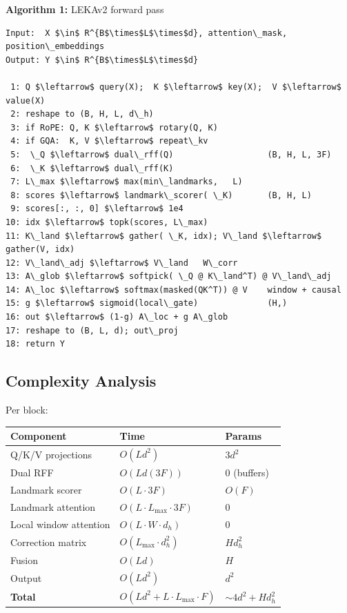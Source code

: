 \textbf{Algorithm 1:} LEKAv2 forward pass
\begin{lstlisting}
Input:  X $\in$ R^{B$\times$L$\times$d}, attention\_mask, position\_embeddings
Output: Y $\in$ R^{B$\times$L$\times$d}

 1: Q $\leftarrow$ query(X);  K $\leftarrow$ key(X);  V $\leftarrow$ value(X)
 2: reshape to (B, H, L, d\_h)
 3: if RoPE: Q, K $\leftarrow$ rotary(Q, K)
 4: if GQA:  K, V $\leftarrow$ repeat\_kv
 5:  \_Q $\leftarrow$ dual\_rff(Q)                   (B, H, L, 3F)
 6:  \_K $\leftarrow$ dual\_rff(K)
 7: L\_max $\leftarrow$ max(min\_landmarks,   L)
 8: scores $\leftarrow$ landmark\_scorer( \_K)       (B, H, L)
 9: scores[:, :, 0] $\leftarrow$ 1e4
10: idx $\leftarrow$ topk(scores, L\_max)
11: K\_land $\leftarrow$ gather( \_K, idx); V\_land $\leftarrow$ gather(V, idx)
12: V\_land\_adj $\leftarrow$ V\_land   W\_corr
13: A\_glob $\leftarrow$ softpick( \_Q @ K\_land^T) @ V\_land\_adj
14: A\_loc $\leftarrow$ softmax(masked(QK^T)) @ V    window + causal
15: g $\leftarrow$ sigmoid(local\_gate)              (H,)
16: out $\leftarrow$ (1-g) A\_loc + g A\_glob
17: reshape to (B, L, d); out\_proj
18: return Y
\end{lstlisting}

\subsection{Complexity Analysis}

Per block:

\begin{table}[H]
\centering
\small
\begin{tabular}{lll}
\toprule
\textbf{Component} & \textbf{Time} & \textbf{Params} \\
\midrule
Q/K/V projections & $O(L d^2)$ & $3 d^2$ \\
Dual RFF & $O(L d (3F))$ & 0 (buffers) \\
Landmark scorer & $O(L \cdot 3F)$ & $O(F)$ \\
Landmark attention & $O(L \cdot L_\text{max} \cdot 3F)$ & 0 \\
Local window attention & $O(L \cdot W \cdot d_h)$ & 0 \\
Correction matrix & $O(L_\text{max} \cdot d_h^2)$ & $H d_h^2$ \\
Fusion & $O(L d)$ & $H$ \\
Output & $O(L d^2)$ & $d^2$ \\
\textbf{Total} & $O(L d^2 + L \cdot L_\text{max} \cdot F)$ & $\sim 4 d^2 + H d_h^2$ \\
\bottomrule
\end{tabular}
\end{table}

